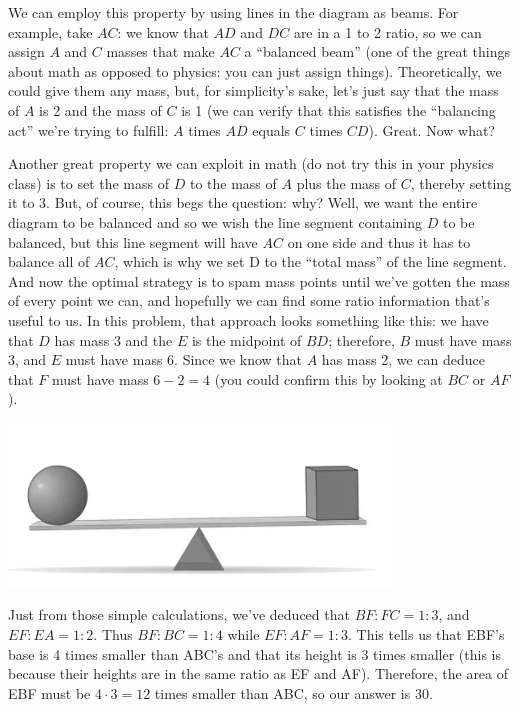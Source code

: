 \documentclass{article}
\begin{document}
We can employ this property by using lines in the diagram as beams. For example, take $AC$: we know that $AD$ and $DC$ are in a 1 to 2 ratio, so we can assign $A$ and $C$ masses that make $AC$ a ``balanced beam'' (one of the great things about math as opposed to physics: you can just assign things). Theoretically, we could give them any mass, but, for simplicity’s sake, let’s just say that the mass of $A$ is 2 and the mass of $C$ is 1 (we can verify that this satisfies the “balancing act” we’re trying to fulfill: $A$ times $AD$ equals $C$ times $CD$). Great. Now what?

Another great property we can exploit in math (do not try this in your physics class) is to set the mass of $D$ to the mass of $A$ plus the mass of $C$, thereby setting it to 3. But, of course, this begs the question: why? Well, we want the entire diagram to be balanced and so we wish the line segment containing $D$ to be balanced, but this line segment will have $AC$ on one side and thus it has to balance all of $AC$, which is why we set D to the “total mass” of the line segment. And now the optimal strategy is to spam mass points until we’ve gotten the mass of every point we can, and hopefully we can find some ratio information that’s useful to us. 
In this problem, that approach looks something like this: we have that $D$ has mass 3 and the $E$ is the midpoint of $BD$; therefore, $B$ must have mass 3, and $E$ must have mass 6. Since we know that $A$ has mass 2, we can deduce that $F$ must have mass $6 - 2 = 4$ (you could confirm this by looking at $BC$ or $AF$). 

\begin{center}
    \includegraphics[width=4in]{images/mass-point.png}
\end{center}

Just from those simple calculations, we’ve deduced that $BF : FC = 1 : 3$, and $EF : EA = 1 : 2$. Thus $BF : BC = 1 : 4$ while $EF : AF  = 1 : 3$. This tells us that EBF's base is 4 times smaller than ABC’s and that its height is 3 times smaller (this is because their heights are in the same ratio as EF and AF). Therefore, the area of EBF must be $4 \cdot 3 = 12$ times smaller than ABC, so our answer is 30. 
\end{document}
